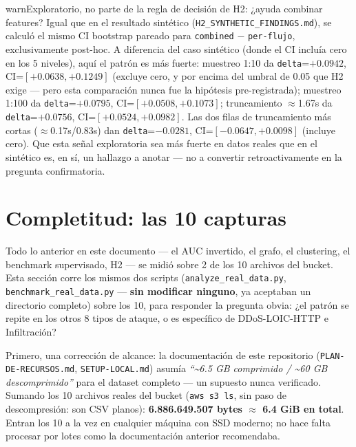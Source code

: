 \documentclass[11pt]{article}
\newcommand{\code}[1]{\texttt{\small #1}}
\begin{document}
\begin{cbox}{warn}{Exploratorio, no parte de la regla de decisión de H2: ¿ayuda combinar features?}
Igual que en el resultado sintético (\code{H2\_SYNTHETIC\_FINDINGS.md}), se calculó el mismo CI
bootstrap pareado para \texttt{combined} $-$ \texttt{per-flujo}, exclusivamente post-hoc. A
diferencia del caso sintético (donde el CI incluía cero en los 5 niveles), aquí el patrón es más
fuerte: muestreo 1:10 da \texttt{delta}=$+0.0942$, CI=$[+0.0638, +0.1249]$ (excluye cero, y por
encima del umbral de 0.05 que H2 exige --- pero esta comparación nunca fue la hipótesis
pre-registrada); muestreo 1:100 da \texttt{delta}=$+0.0795$, CI=$[+0.0508, +0.1073]$; truncamiento
$\approx$1.67s da \texttt{delta}=$+0.0756$, CI=$[+0.0524, +0.0982]$. Las dos filas de
truncamiento más cortas ($\approx$0.17s/0.83s) dan \texttt{delta}=$-0.0281$, CI=$[-0.0647,+0.0098]$
(incluye cero). Que esta señal exploratoria sea más fuerte en datos reales que en el sintético es,
en sí, un hallazgo a anotar --- no a convertir retroactivamente en la pregunta confirmatoria.
\end{cbox}

\section{Completitud: las 10 capturas}
\label{sec:completitud}

Todo lo anterior en este documento --- el AUC invertido, el grafo, el clustering, el benchmark
supervisado, H2 --- se midió sobre 2 de los 10 archivos del bucket. Esta sección corre los mismos
dos scripts (\code{analyze\_real\_data.py}, \code{benchmark\_real\_data.py} --- \textbf{sin
modificar ninguno}, ya aceptaban un directorio completo) sobre los 10, para responder la pregunta
obvia: ¿el patrón se repite en los otros 8 tipos de ataque, o es específico de DDoS-LOIC-HTTP e
Infiltración?

Primero, una corrección de alcance: la documentación de este repositorio (\code{PLAN-DE-RECURSOS.md},
\code{SETUP-LOCAL.md}) asumía \textit{``\textasciitilde 6.5 GB comprimido / \textasciitilde 60 GB
descomprimido''} para el dataset completo --- un supuesto nunca verificado. Sumando los 10 archivos
reales del bucket (\code{aws s3 ls}, sin paso de descompresión: son CSV planos): \textbf{6.886.649.507
bytes $\approx$ 6.4 GiB en total}. Entran los 10 a la vez en cualquier máquina con SSD moderno;
no hace falta procesar por lotes como la documentación anterior recomendaba.
\end{document}
